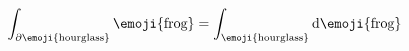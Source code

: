 \documentclass{article}
\begin{document}
  
$
  \displaystyle
    \int_{\partial\text{\emoji{hourglass}}} \text{\emoji{frog}}
  = \int_\text{\emoji{hourglass}} \mathrm{d}\text{\emoji{frog}}
$
\end{document}
